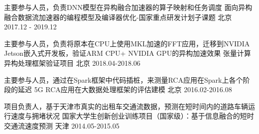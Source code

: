 

\begin{cventries}

  \cventry
    {主要参与人员，负责DNN模型在异构融合加速器的算子映射和任务调度} %
    {面向异构融合数据流加速器的编程模型及编译器优化-国家重点研发计划子课题} %
    {北京} %
    {2017.12 - 2019.12} %
    {
    }

  \cventry
    {主要参与人员，负责将原本在CPU上使用MKL加速的FFT应用，迁移到NVIDIA Jetson嵌入式开发板，验证ARM CPU+ NVIDIA GPU的异构加速效果} %
    {张量计算异构处理框架验证项目} %
    {北京} %
    {2018.04-2018.06} %
    {
    }

  \cventry
    {主要参与人员，通过在Spark框架中代码插桩，来测量RCA应用在Spark上各个阶段的延迟} %
    {5G RCA应用在大数据处理框架的评估建模} %
    {北京} %
    {2016.02-2016.08} %
    {
    }

\cventry
{项目负责人，基于天津市真实的出租车交通流数据，预测在短时间内的道路车辆运行速度与拥堵状况} %
{国家大学生创新创业训练项目（国家级）：基于信息融合的短时交通流速度预测} %
{天津} %
{2014.05-2015.05} %
{
}

\end{cventries}
